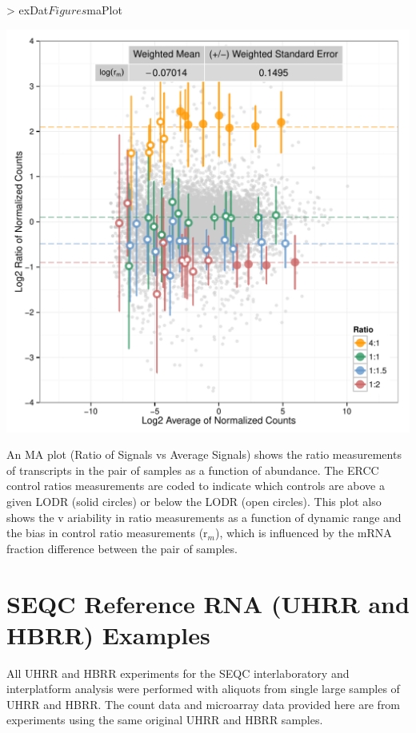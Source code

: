 \documentclass{article}
\begin{document}
\begin{center}
\begin{Schunk}
\begin{Sinput}
> exDat$Figures$maPlot
\end{Sinput}
\end{Schunk}
\includegraphics{erccdashboardVignette-ratPlotD}
\end{center}
An MA plot (Ratio of Signals vs Average Signals) shows the ratio measurements of
transcripts in the pair of samples as a function of abundance. The ERCC control 
ratios measurements are coded to indicate which controls are above a given LODR 
(solid circles) or below the LODR (open circles). This plot also shows the v
ariability in ratio measurements as a function of dynamic range and the bias in 
control ratio measurements (r$_m$), which is influenced by the mRNA fraction difference
between the pair of samples.

\section{SEQC Reference RNA (UHRR and HBRR) Examples}
All UHRR and HBRR experiments for the SEQC interlaboratory and interplatform 
analysis were performed with aliquots from single large samples of UHRR and 
HBRR. The count data and microarray data provided here are from experiments 
using the same original UHRR and HBRR samples.
\end{document}
